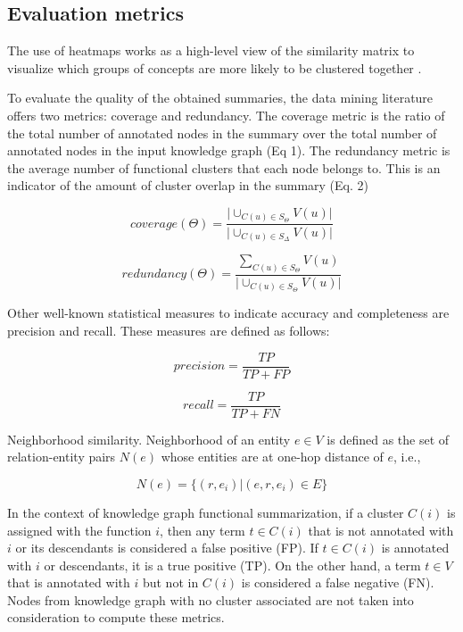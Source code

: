 \documentclass{ieeeaccess}
\begin{document}
\subsection{Evaluation metrics}

The use of heatmaps works as a high-level view of the similarity matrix to
visualize which groups of concepts are more likely to be clustered together \cite{NGUYEN201495}. 

To evaluate the quality of the obtained summaries, the data
mining literature offers two metrics: coverage and redundancy. The
coverage metric is the ratio of the total number of annotated nodes in the
summary over the total number of annotated nodes in the input knowledge 
graph (Eq 1). The redundancy metric is the average number of functional clusters 
that each node belongs to. This is an indicator of the amount of cluster overlap in 
the summary (Eq. 2)

\begin{equation}
\label{eqn_coverage}
coverage(\Theta) = \frac{\lvert \cup_{C(u) \in S_{\Theta}}  V(u)
\rvert}{\lvert \cup_{C(u) \in S_{\Delta}} V(u)\rvert}
\end{equation}

\begin{equation}
\label{eqn_redundancy}
redundancy(\Theta) = \frac{\sum_{C(u) \in S_{\Theta}} V(u) }
{\lvert \cup_{C(u) \in S_{\Theta}}  V(u)
\rvert} 
\end{equation}

Other well-known statistical measures to indicate accuracy and completeness are
precision and recall. These measures are defined as follows:

\begin{equation}
\label{eqn_precision}
precision = \frac{TP}{TP + FP}
\end{equation}

\begin{equation}
\label{eqn_recall}
recall = \frac{TP}{TP + FN}
\end{equation}

Neighborhood similarity. Neighborhood of an entity $e \in V$ is 
defined as the set of relation-entity pairs $N(e)$ whose entities
are at one-hop distance of $e$, i.e.,

\begin{equation}
    N(e) = \{(r, e_{i})|(e,r,e_{i}) \in E \}
\end{equation}

In the context of knowledge graph functional summarization, if a
cluster $C(i)$ is assigned with the function $i$, then any term $t \in C(i)$
that is not annotated with $i$ or its descendants is considered a false positive (FP).
If $t \in C(i)$ is annotated with $i$ or descendants, it is a true positive (TP). On the other
hand, a term $t \in V$ that is annotated with $i$ but not in $C(i)$ is considered a false negative (FN).
Nodes from knowledge graph with no cluster associated are not taken into consideration to compute these metrics.
\end{document}
